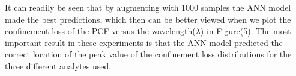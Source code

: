 \documentclass[draft, a4, 10pt, onecolumn]{IEEEtran}
\begin{document}
\begin{figure}[h]
\begin{subfigure}{.5\textwidth}
\end{subfigure}
\caption{}
\end{figure}
\newpage
It can readily be seen that by augmenting with 1000 samples the ANN model made the best predictions, which then can be better viewed when we plot the confinement loss of the PCF versus the wavelength($\lambda$) in Figure(5).
The most important result in these experiments is that the ANN model predicted the correct location of the peak value of the confinement loss distributions for the three different analytes used. 
\end{document}
